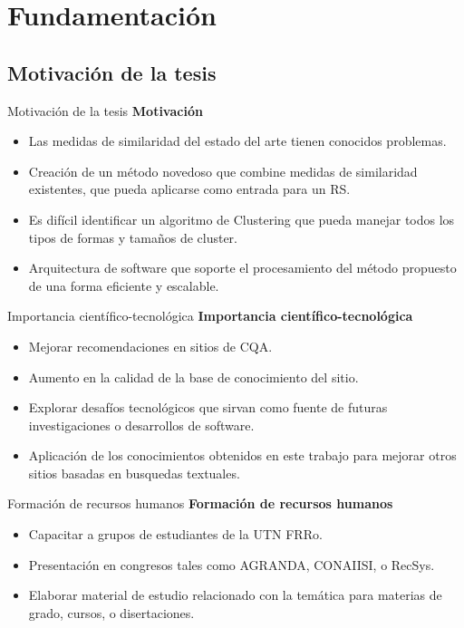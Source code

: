 \section{Fundamentación}

\subsection{Motivación de la tesis}
\begin{frame}{Motivación de la tesis}
	\textbf{Motivación}
	\bigskip
	\begin{itemize} [<+>]
		\item Las medidas de similaridad del estado del arte tienen conocidos problemas.
		\item Creación de un método novedoso que combine medidas de similaridad existentes, que pueda aplicarse como entrada para un RS.
		\item Es difícil identificar un algoritmo de Clustering que pueda manejar todos los tipos de formas y tamaños de cluster.
		\item Arquitectura de software que soporte el procesamiento del método propuesto de una forma eficiente y escalable.
	\end{itemize}
\end{frame}

\begin{frame}{Importancia científico-tecnológica}
	\textbf{Importancia científico-tecnológica}
	\bigskip
	\begin{itemize} [<+>]
		\item Mejorar recomendaciones en sitios de CQA.
		\item Aumento en la calidad de la base de conocimiento del sitio.
		\item Explorar desafíos tecnológicos que sirvan como fuente de futuras investigaciones o desarrollos de software.
		\item Aplicación de los conocimientos obtenidos en este trabajo para mejorar otros sitios basadas en busquedas textuales.
	\end{itemize}
\end{frame}

\begin{frame}{Formación de recursos humanos}
	\textbf{Formación de recursos humanos}
	\bigskip
	\begin{itemize} [<+>]
		\item Capacitar a grupos de estudiantes de la UTN FRRo.
		\item Presentación en congresos tales como AGRANDA, CONAIISI, o RecSys.
		\item Elaborar material de estudio relacionado con la temática para materias de grado, cursos, o disertaciones.
	\end{itemize}
\end{frame}